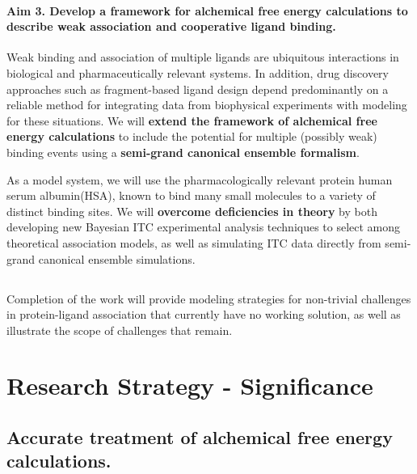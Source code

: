 \documentclass[10pt,final]{article}
\newif\ifinstr
\newcommand{\instr}[1]{\ifdraft{\ifinstr {\color{cyan}\emph{#1}} \fi}{}}
\begin{document}
\paragraph*{Aim 3. Develop a framework for alchemical free energy calculations to describe weak association and cooperative ligand binding.}
Weak binding and association of multiple ligands are ubiquitous interactions in biological and pharmaceutically relevant systems.
In addition, drug discovery approaches such as fragment-based ligand design depend predominantly on a reliable method for integrating data from biophysical experiments with modeling for these situations.
We will \textbf{ extend the framework of alchemical free energy calculations}  to include the potential for multiple (possibly weak) binding events using a \textbf{ semi-grand canonical ensemble formalism}.

As a model system, we will use the pharmacologically relevant protein human serum albumin(HSA), known to bind many small molecules to a variety of distinct binding sites.
We will \textbf{overcome deficiencies in theory } by both developing new Bayesian ITC experimental analysis techniques to select among theoretical association models, as well as simulating ITC data directly from semi-grand canonical ensemble simulations.

\subsection*{} %

Completion of the work will provide modeling strategies for non-trivial challenges in protein-ligand association that currently have no working solution, as well as illustrate the scope of challenges that remain.

\section*{Research Strategy - Significance}
\instr{General background, significance in terms of basic science and disease relevance.}

\subsection*{Accurate treatment of alchemical free energy calculations.}
\end{document}
